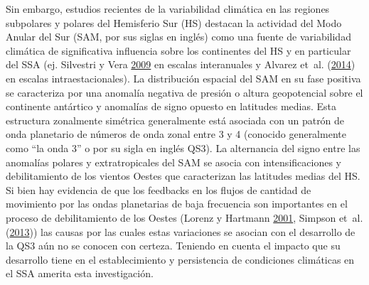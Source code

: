 \documentclass[spanish,a4paper,12p]{book}
\begin{document}
Sin embargo, estudios recientes de la variabilidad climática en las
regiones subpolares y polares del Hemisferio Sur (HS) destacan la
actividad del Modo Anular del Sur (SAM, por sus siglas en inglés) como
una fuente de variabilidad climática de significativa influencia sobre
los continentes del HS y en particular del SSA (ej. Silvestri y Vera
\protect\hyperlink{ref-Silvestri2009}{2009} en escalas interanuales y
Alvarez et~al. (\protect\hyperlink{ref-Alvarez2014}{2014}) en escalas
intraestacionales). La distribución espacial del SAM en su fase positiva
se caracteriza por una anomalía negativa de presión o altura
geopotencial sobre el continente antártico y anomalías de signo opuesto
en latitudes medias. Esta estructura zonalmente simétrica generalmente
está asociada con un patrón de onda planetario de números de onda zonal
entre 3 y 4 (conocido generalmente como ``la onda 3'' o por su sigla en
inglés QS3). La alternancia del signo entre las anomalías polares y
extratropicales del SAM se asocia con intensificaciones y debilitamiento
de los vientos Oestes que caracterizan las latitudes medias del HS. Si
bien hay evidencia de que los feedbacks en los flujos de cantidad de
movimiento por las ondas planetarias de baja frecuencia son importantes
en el proceso de debilitamiento de los Oestes (Lorenz y Hartmann
\protect\hyperlink{ref-Lorenz2001}{2001}, Simpson et~al.
(\protect\hyperlink{ref-Simpson2013}{2013})) las causas por las cuales
estas variaciones se asocian con el desarrollo de la QS3 aún no se
conocen con certeza. Teniendo en cuenta el impacto que su desarrollo
tiene en el establecimiento y persistencia de condiciones climáticas en
el SSA amerita esta investigación.
\end{document}
